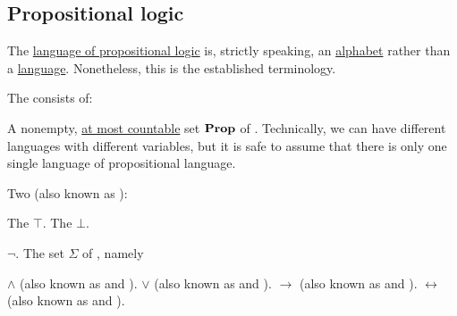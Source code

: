 \subsection{Propositional logic}\label{subsec:propositional_logic}

\begin{remark}\label{rem:propositional_language_is_alphabet}
  The \hyperref[def:propositional_language]{language of propositional logic} is, strictly speaking, an \hyperref[def:language/alphabet]{alphabet} rather than a \hyperref[def:language/language]{language}. Nonetheless, this is the established terminology.
\end{remark}

\begin{definition}\label{def:propositional_language}
  The  consists of:

  \begin{thmenum}
     A nonempty, \hyperref[def:set_countability/at_most_countable]{at most countable} set \( \operatorname{\mathbf{Prop}} \) of . Technically, we can have different languages with different variables, but it is safe to assume that there is only one single language of propositional language.

     Two  (also known as ):
    \begin{thmenum}
       The  \( \top \).
       The  \( \bot \).
    \end{thmenum}

      \( \neg \).
     The set \( \Sigma \) of , namely
    \begin{thmenum}
        \( \wedge \) (also known as \hyperref[def:standard_boolean_operators]{} and \hyperref[def:semilattice/meet]{}).
        \( \vee \) (also known as \hyperref[def:standard_boolean_operators]{} and \hyperref[def:semilattice/join]{}).
        \( \rightarrow \) (also known as  and \hyperref[def:material_implication]{}).
        \( \leftrightarrow \) (also known as  and ).
    \end{thmenum}


\end{thmenum}
\end{definition}

